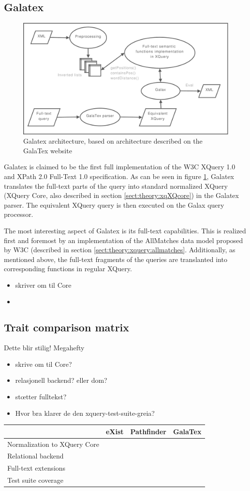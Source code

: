\subsection{Galatex}
\begin{figure}[h]
  \centering
    \includegraphics[width=1\textwidth]{diagrams/galatex_arch}
  \caption[GalaTex architecture]{Galatex architecture, based on architecture described on
  the GalaTex website\cite{galatex}}
  \label{figure:galatex:arch}
\end{figure}
Galatex is claimed to be the first full implementation of the W3C XQuery 1.0 
and XPath 2.0 Full-Text 1.0 specification\cite{w3c01}. As can be seen in figure
\ref{figure:galatex:arch}, Galatex translates the full-text parts of the query
into standard normalized XQuery (XQuery Core\cite{xquery_semantics}, also
described in section \ref{sect:theory:xqXQcore}) in the Galatex parser. The equivalent
XQuery query is then executed on the Galax query processor.

The most interesting aspect of Galatex is its full-text capabilities. This is
realized first and foremost by an implementation of the AllMatches data model
proposed by W3C (described in section \ref{sect:theory:xquery:allmatches}.
Additionally, as mentioned above, the full-text fragments of the queries are
translanted into corresponding functions in regular XQuery. 

\begin{itemize}
    \item skriver om til Core
    \item 
\end{itemize}

\subsection{Trait comparison matrix}
Dette blir stilig! Megahefty
\begin{itemize}
    \item skrive om til Core?
    \item relasjonell backend? eller dom?
    \item st\oe tter fulltekst?
    \item Hvor bra klarer de den xquery-test-suite-greia?
\end{itemize}


\begin{tabular}{ | p{3cm} | l | l | l |}
\hline
& eXist & Pathfinder & GalaTex \\ \hline
Normalization to XQuery Core & & & \\ \hline
Relational backend & & & \\ \hline
Full-text extensions & & & \\ \hline
Test suite coverage & & & \\
\hline
\end{tabular}